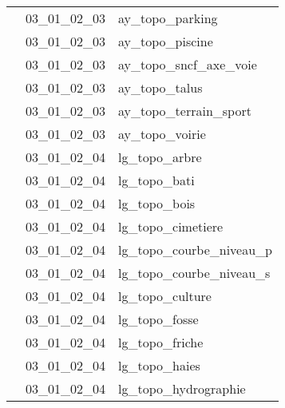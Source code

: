 \documentclass[12pt,titlepage]{book}
\begin{document}
\begin{supertabular}{|p{10cm}|c|p{15cm}|}
                    & 03\_01\_02\_03 & ay\_topo\_parking\\


                    & 03\_01\_02\_03 & ay\_topo\_piscine\\


                    & 03\_01\_02\_03 & ay\_topo\_sncf\_axe\_voie\\


                    & 03\_01\_02\_03 & ay\_topo\_talus\\


                    & 03\_01\_02\_03 & ay\_topo\_terrain\_sport\\


                    & 03\_01\_02\_03 & ay\_topo\_voirie\\


                    & 03\_01\_02\_04 & lg\_topo\_arbre\\


                    & 03\_01\_02\_04 & lg\_topo\_bati\\


                    & 03\_01\_02\_04 & lg\_topo\_bois\\


                    & 03\_01\_02\_04 & lg\_topo\_cimetiere\\


                    & 03\_01\_02\_04 & lg\_topo\_courbe\_niveau\_p\\


                    & 03\_01\_02\_04 & lg\_topo\_courbe\_niveau\_s\\


                    & 03\_01\_02\_04 & lg\_topo\_culture\\


                    & 03\_01\_02\_04 & lg\_topo\_fosse\\


                    & 03\_01\_02\_04 & lg\_topo\_friche\\


                    & 03\_01\_02\_04 & lg\_topo\_haies\\


                    & 03\_01\_02\_04 & lg\_topo\_hydrographie\\



\end{supertabular}
\end{document}
